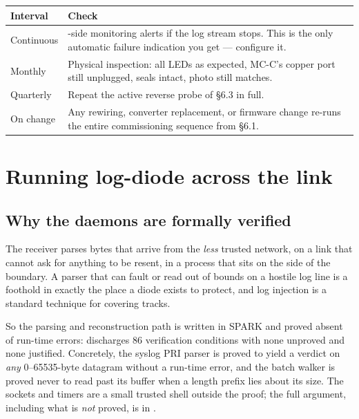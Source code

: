 \documentclass[11pt,a4paper]{article}
\begin{document}
\begin{table}[h]
\centering\small
\begin{tabularx}{\textwidth}{@{}p{26mm}X@{}}
\toprule
\textbf{Interval} & \textbf{Check} \\
\midrule
Continuous & \dstside{}-side monitoring alerts if the log stream stops. This
             is the only automatic failure indication you get --- configure it. \\
Monthly    & Physical inspection: all LEDs as expected, MC-C's copper port
             still unplugged, seals intact, photo still matches. \\
Quarterly  & Repeat the active reverse probe of \S6.3 in full. \\
On change  & Any rewiring, converter replacement, or firmware change re-runs
             the entire commissioning sequence from \S6.1. \\
\bottomrule
\end{tabularx}
\end{table}

\section{Running log-diode across the link}
\label{sec:integrate}

\subsection{Why the daemons are formally verified}

The receiver parses bytes that arrive from the \emph{less} trusted network,
on a link that cannot ask for anything to be resent, in a process that sits on
the \dstside{} side of the boundary. A parser that can fault or read out of
bounds on a hostile log line is a foothold in exactly the place a diode exists
to protect, and log injection is a standard technique for covering tracks.

So the parsing and reconstruction path is written in SPARK and proved absent
of run-time errors:  discharges 86 verification
conditions with none unproved and none justified. Concretely, the syslog PRI
parser is proved to yield a verdict on \emph{any} 0--65535-byte datagram
without a run-time error, and the batch walker is proved never to read past
its buffer when a length prefix lies about its size. The sockets and timers
are a small trusted shell outside the proof; the full argument, including what
is \emph{not} proved, is in .
\end{document}
